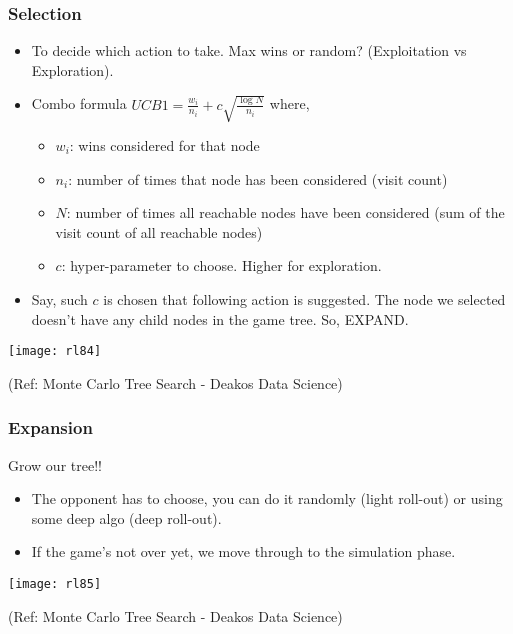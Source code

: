 \begin{frame}[fragile]\frametitle{Selection}

\begin{itemize}
\item To decide which action to take. Max wins or random? (Exploitation vs Exploration). 
\item Combo formula $UCB1 = \frac{w_i}{n_i} + c \sqrt{\frac{\log N}{n_i}}$ where,
	\begin{itemize}
	\item $w_i$: wins considered for that node
	\item $n_i$: number of times that node has been considered (visit count)
	\item $N$: number of times all reachable nodes have been considered (sum of the visit count of all reachable nodes)
	\item $c$: hyper-parameter to choose. Higher for exploration.
	\end{itemize}
\item Say, such $c$ is chosen that following action is suggested. The node we selected doesn’t have any child nodes in the game tree. So, EXPAND.
\end{itemize}

\begin{center}
\texttt{[image: rl84]}
\end{center}


{\tiny (Ref: Monte Carlo Tree Search - Deakos Data Science)}

\end{frame}

\begin{frame}[fragile]\frametitle{Expansion}
Grow our tree!!

\begin{itemize}
\item The opponent has to choose, you can do it randomly (light roll-out) or using some deep algo (deep roll-out).
\item If the game’s not over yet, we move through to the simulation phase. 
\end{itemize}

\begin{center}
\texttt{[image: rl85]}
\end{center}


{\tiny (Ref: Monte Carlo Tree Search - Deakos Data Science)}

\end{frame}

